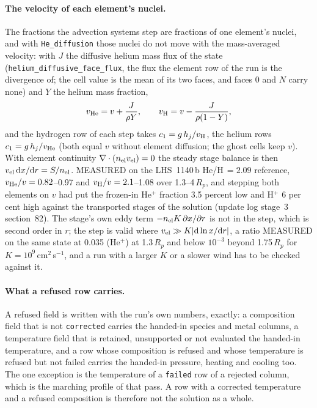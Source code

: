 \paragraph{The velocity of each element's nuclei.} The fractions the
advection systems step are fractions of one element's nuclei, and with
\texttt{He\_diffusion} those nuclei do not move with the mass-averaged
velocity: with $J$ the diffusive helium mass flux of the state
(\texttt{helium\_diffusive\_face\_flux}, the flux the element row of the run
is the divergence of; the cell value is the mean of its two faces, and faces
0 and $N$ carry none) and $Y$ the helium mass fraction,
\begin{equation}
v_{\rm He} = v + \frac{J}{\rho Y},\qquad
v_{\rm H} = v - \frac{J}{\rho(1-Y)},
\label{eq:pp:vnuc}
\end{equation}
and the hydrogen row of each step takes $c_1 = g\,h_j/v_{\rm H}$, the helium
rows $c_1 = g\,h_j/v_{\rm He}$ (both equal $v$ without element diffusion;
the ghost cells keep $v$).  With element continuity
$\nabla\cdot(n_{\rm el}v_{\rm el}) = 0$ the steady stage balance is then
$v_{\rm el}\,{\rm d}x/{\rm d}r = S/n_{\rm el}$.  MEASURED on the LHS~1140\,b
He/H\,$=2.09$ reference, $v_{\rm He}/v = 0.82$--0.97 and
$v_{\rm H}/v = 2.1$--1.08 over 1.3--4\,$R_p$, and stepping both elements on
$v$ had put the frozen-in He$^+$ fraction 3.5 percent low and H$^+$ 6 per
cent high against the transported stages of the solution (update log
stage~3 section~82).  The stage's own eddy term $-n_{\rm el}K\,\partial
x/\partial r$ is not in the step, which is second order in $r$; the step is
valid where $v_{\rm el} \gg K|{\rm d}\ln x/{\rm d}r|$, a ratio MEASURED on
the same state at 0.035 (He$^+$) at 1.3\,$R_p$ and below $10^{-3}$ beyond
1.75\,$R_p$ for $K = 10^9$\,cm$^2$\,s$^{-1}$, and a run with a larger $K$
or a slower wind has to be checked against it.

\paragraph{What a refused row carries.}  A refused field is written with
the run's own numbers, exactly: a composition field that is not
\texttt{corrected} carries the handed-in species and metal columns, a
temperature field that is retained, unsupported or not evaluated the
handed-in temperature, and a row whose composition is refused and whose
temperature is refused but not failed carries the handed-in pressure,
heating and cooling too.  The one exception is the temperature of a
\texttt{failed} row of a rejected column, which is the marching profile of
that pass.  A row with a corrected temperature and a refused composition is
therefore not the solution as a whole.

